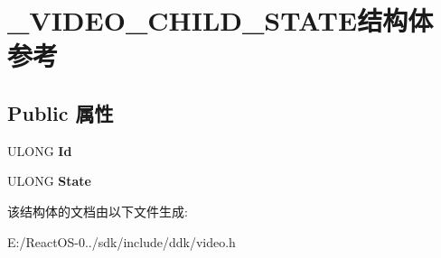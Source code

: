 \hypertarget{struct___v_i_d_e_o___c_h_i_l_d___s_t_a_t_e}{}\section{\+\_\+\+V\+I\+D\+E\+O\+\_\+\+C\+H\+I\+L\+D\+\_\+\+S\+T\+A\+T\+E结构体 参考}
\label{struct___v_i_d_e_o___c_h_i_l_d___s_t_a_t_e}
\subsection*{Public 属性}
\begin{DoxyCompactItemize}
\item 
\mbox{\label{struct___v_i_d_e_o___c_h_i_l_d___s_t_a_t_e_a43878d063b71446c12dcc36c97862e8b}} 
U\+L\+O\+NG {\bfseries Id}
\item 
\mbox{\label{struct___v_i_d_e_o___c_h_i_l_d___s_t_a_t_e_a492c0ff81e5666361b2064da98c2edbd}} 
U\+L\+O\+NG {\bfseries State}
\end{DoxyCompactItemize}


该结构体的文档由以下文件生成\+:\begin{DoxyCompactItemize}
\item 
E\+:/\+React\+O\+S-\/0../sdk/include/ddk/video.\+h\end{DoxyCompactItemize}
